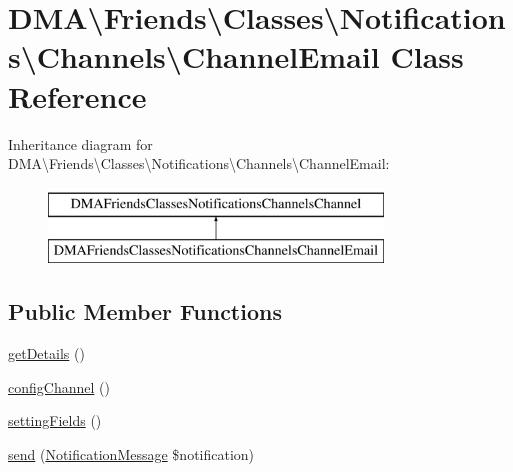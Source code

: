 \hypertarget{classDMA_1_1Friends_1_1Classes_1_1Notifications_1_1Channels_1_1ChannelEmail}{\section{D\+M\+A\textbackslash{}Friends\textbackslash{}Classes\textbackslash{}Notifications\textbackslash{}Channels\textbackslash{}Channel\+Email Class Reference}
\label{classDMA_1_1Friends_1_1Classes_1_1Notifications_1_1Channels_1_1ChannelEmail}
}
Inheritance diagram for D\+M\+A\textbackslash{}Friends\textbackslash{}Classes\textbackslash{}Notifications\textbackslash{}Channels\textbackslash{}Channel\+Email\+:\begin{figure}[H]
\begin{center}
\leavevmode
\includegraphics[height=2.000000cm]{dd/d1a/classDMA_1_1Friends_1_1Classes_1_1Notifications_1_1Channels_1_1ChannelEmail}
\end{center}
\end{figure}
\subsection*{Public Member Functions}
\begin{DoxyCompactItemize}
\item 
\hyperlink{classDMA_1_1Friends_1_1Classes_1_1Notifications_1_1Channels_1_1ChannelEmail_a475f4bcecb6f6a68f8938606b75257c5}{get\+Details} ()
\item 
\hyperlink{classDMA_1_1Friends_1_1Classes_1_1Notifications_1_1Channels_1_1ChannelEmail_aa1435fd7c5b6aa3119cbaedf08277275}{config\+Channel} ()
\item 
\hyperlink{classDMA_1_1Friends_1_1Classes_1_1Notifications_1_1Channels_1_1ChannelEmail_a5e2c8c7c67de35cd99f5cdd9b4cc31cd}{setting\+Fields} ()
\item 
\hyperlink{classDMA_1_1Friends_1_1Classes_1_1Notifications_1_1Channels_1_1ChannelEmail_a92161c6ed146cfef431ae1deafd0d751}{send} (\hyperlink{classDMA_1_1Friends_1_1Classes_1_1Notifications_1_1NotificationMessage}{Notification\+Message} \$notification)
\end{DoxyCompactItemize}
